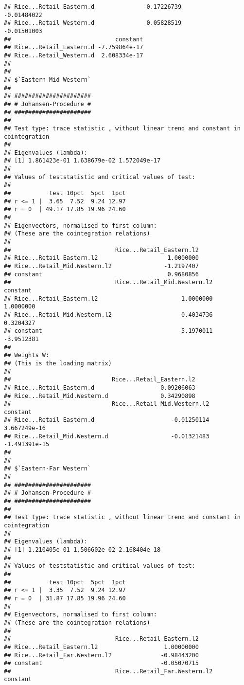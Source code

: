\documentclass[12pt,]{article}
\begin{document}
\begin{verbatim}
## Rice...Retail_Eastern.d              -0.17226739              -0.01484022
## Rice...Retail_Western.d               0.05828519              -0.01501003
##                              constant
## Rice...Retail_Eastern.d -7.759864e-17
## Rice...Retail_Western.d  2.608334e-17
## 
## 
## $`Eastern-Mid Western`
## 
## ###################### 
## # Johansen-Procedure # 
## ###################### 
## 
## Test type: trace statistic , without linear trend and constant in cointegration 
## 
## Eigenvalues (lambda):
## [1] 1.861423e-01 1.638679e-02 1.572049e-17
## 
## Values of teststatistic and critical values of test:
## 
##           test 10pct  5pct  1pct
## r <= 1 |  3.65  7.52  9.24 12.97
## r = 0  | 49.17 17.85 19.96 24.60
## 
## Eigenvectors, normalised to first column:
## (These are the cointegration relations)
## 
##                              Rice...Retail_Eastern.l2
## Rice...Retail_Eastern.l2                    1.0000000
## Rice...Retail_Mid.Western.l2               -1.2197407
## constant                                    0.9680856
##                              Rice...Retail_Mid.Western.l2   constant
## Rice...Retail_Eastern.l2                        1.0000000  1.0000000
## Rice...Retail_Mid.Western.l2                    0.4034736  0.3204327
## constant                                       -5.1970011 -3.9512381
## 
## Weights W:
## (This is the loading matrix)
## 
##                             Rice...Retail_Eastern.l2
## Rice...Retail_Eastern.d                  -0.09206063
## Rice...Retail_Mid.Western.d               0.34290898
##                             Rice...Retail_Mid.Western.l2      constant
## Rice...Retail_Eastern.d                      -0.01250114  3.667249e-16
## Rice...Retail_Mid.Western.d                  -0.01321483 -1.491391e-15
## 
## 
## $`Eastern-Far Western`
## 
## ###################### 
## # Johansen-Procedure # 
## ###################### 
## 
## Test type: trace statistic , without linear trend and constant in cointegration 
## 
## Eigenvalues (lambda):
## [1] 1.210405e-01 1.506602e-02 2.168404e-18
## 
## Values of teststatistic and critical values of test:
## 
##           test 10pct  5pct  1pct
## r <= 1 |  3.35  7.52  9.24 12.97
## r = 0  | 31.87 17.85 19.96 24.60
## 
## Eigenvectors, normalised to first column:
## (These are the cointegration relations)
## 
##                              Rice...Retail_Eastern.l2
## Rice...Retail_Eastern.l2                   1.00000000
## Rice...Retail_Far.Western.l2              -0.98443200
## constant                                  -0.05070715
##                              Rice...Retail_Far.Western.l2   constant

\end{verbatim}
\end{document}
